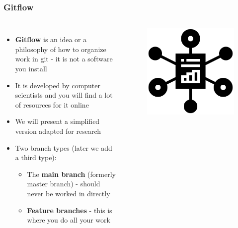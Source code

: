 \documentclass[aspectratio=169]{beamer} %
\begin{document}
\begin{frame}
	\frametitle{Gitflow}
	\begin{columns}[c]

		\begin{itemize}
			\setlength\itemsep{.5em}
			\item \textbf{Gitflow} is an idea or a philosophy 
			of how to organize work in git - it is not a software you install
			\item It is developed by computer scientists and
			you will find a lot of resources for it online
			\item We will present a simplified version adapted for research
			\item Two branch types (later we add a third type):
			\begin{itemize}
				\item The \textbf{main branch} (formerly master branch)
				- should never be worked in directly
				\item \textbf{Feature branches} - this is where you do all your work
			\end{itemize}
		\end{itemize}

		\vspace{-.75cm}
		\begin{figure}
			\centering
			\includegraphics[width=.75\textwidth]{./img/organization.png}
		\end{figure}
	\end{columns}
\end{frame}
\end{document}
